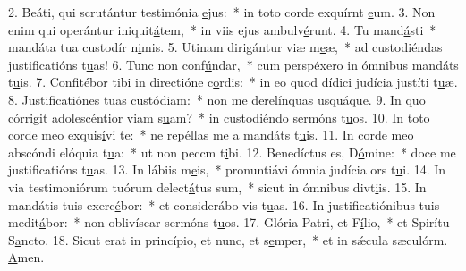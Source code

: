 2. Beáti, qui scrutántur testimónia \uline{e}jus:~* in toto corde exquírnt \uline{e}um.
3. Non enim qui operántur iniquit\uline{á}tem,~* in viis ejus ambulv\uline{é}runt.
4. Tu mand\uline{á}sti~* mandáta tua custodír n\uline{i}mis.
5. Utinam dirigántur viæ m\uline{e}æ,~* ad custodiéndas justificatións t\uline{u}as!
6. Tunc non conf\uline{ú}ndar,~* cum perspéxero in ómnibus mandáts t\uline{u}is.
7. Confitébor tibi in directióne c\uline{o}rdis:~* in eo quod dídici judícia justíti t\uline{u}æ.
8. Justificatiónes tuas cust\uline{ó}diam:~* non me derelínquas us\uline{quá}que.
9. In quo córrigit adolescéntior viam s\uline{u}am?~* in custodiéndo sermóns t\uline{u}os.
10. In toto corde meo exquis\uline{í}vi te:~* ne repéllas me a mandáts t\uline{u}is.
11. In corde meo abscóndi elóquia t\uline{u}a:~* ut non peccm t\uline{i}bi.
12. Benedíctus es, D\uline{ó}mine:~* doce me justificatións t\uline{u}as.
13. In lábiis m\uline{e}is,~* pronuntiávi ómnia judícia ors t\uline{u}i.
14. In via testimoniórum tuórum delect\uline{á}tus sum,~* sicut in ómnibus divt\uline{i}is.
15. In mandátis tuis exerc\uline{é}bor:~* et considerábo vis t\uline{u}as.
16. In justificatiónibus tuis medit\uline{á}bor:~* non oblivíscar sermóns t\uline{u}os.
17. Glória Patri, et F\uline{í}lio,~* et Spirítu S\uline{a}ncto.
18. Sicut erat in princípio, et nunc, et s\uline{e}mper,~* et in sǽcula sæculórm. \uline{A}men.
